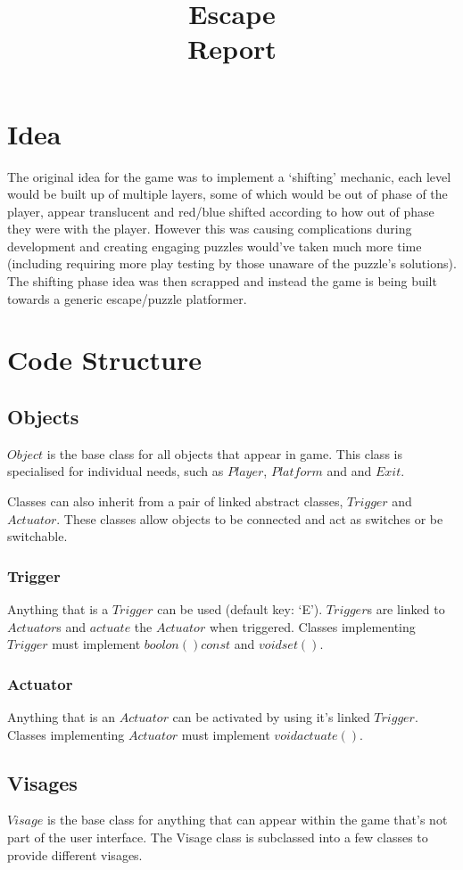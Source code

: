 \documentclass[english]{article}
\title{Escape\\ Report}
\author{} %
\date{} %
\begin{document}
\maketitle
\tableofcontents
\section{Idea}
The original idea for the game was to implement a `shifting' mechanic, each level would be built up of multiple layers, some of which would be out of phase of the player, appear translucent and red/blue shifted according to how out of phase they were with the player. However this was causing complications during development and creating engaging puzzles would've taken much more time (including requiring more play testing by those unaware of the puzzle's solutions). The shifting phase idea was then scrapped and instead the game is being built towards a generic escape/puzzle platformer.

\section{Code Structure}
\subsection{Objects}
$Object$ is the base class for all objects that appear in game. This class is specialised for individual needs, such as $Player$, $Platform$ and and $Exit$.

Classes can also inherit from a pair of linked abstract classes, $Trigger$ and $Actuator$. These classes allow objects to be connected and act as switches or be switchable.
\subsubsection{Trigger}
Anything that is a $Trigger$ can be used (default key: `E'). $Trigger$s are linked to $Actuator$s and $actuate$ the $Actuator$ when triggered.
Classes implementing $Trigger$ must implement $bool on() const$ and $void set()$.

\subsubsection{Actuator}
Anything that is an $Actuator$ can be activated by using it's linked $Trigger$.
Classes implementing $Actuator$ must implement $void actuate()$.

\subsection{Visages}
$Visage$ is the base class for anything that can appear within the game that's not part of the user interface.
The Visage class is subclassed into a few classes to provide different visages.
\end{document}
